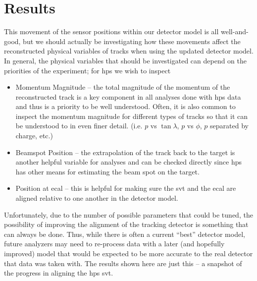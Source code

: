 \section{Results}
This movement of the sensor positions within our detector model is all well-and-good,
but we should actually be investigating how these movements affect the reconstructed
physical variables of tracks when using the updated detector model.
In general, the physical variables that should be investigated can depend on the
priorities of the experiment; for \ac{hps} we wish to inspect
\begin{itemize}
  \item Momentum Magnitude -- the total magnitude of the momentum of the reconstructed
    track is a key component in all analyses done with \ac{hps} data and thus is a
    priority to be well understood. Often, it is also common to inspect the momentum
    magnitude for different types of tracks so that it can be understood to in even
    finer detail. (i.e. $p$ vs $\tan\lambda$, $p$ vs $\phi$, $p$ separated by charge,
    etc.)
  \item Beamspot Position -- the extrapolation of the track back to the target is
    another helpful variable for analyses and can be checked directly since \ac{hps}
    has other means for estimating the beam spot on the target.
  \item Position at \ac{ecal} -- this is helpful for making sure the \ac{svt} and
    the \ac{ecal} are aligned relative to one another in the detector model.
\end{itemize}

Unfortunately, due to the number of possible parameters that could be tuned,
the possibility of improving the alignment of the tracking detector is something
that can always be done.
Thus, while there is often a current ``best'' detector model, future analyzers
may need to re-process data with a later (and hopefully improved) model that
would be expected to be more accurate to the real detector that data was taken with.
The results shown here are just this -- a snapshot of the progress in aligning the
\ac{hps} \ac{svt}.

